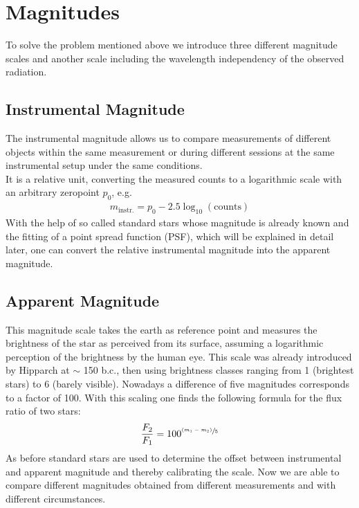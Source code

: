 \section{Magnitudes}
To solve the problem mentioned above we introduce three different magnitude scales and another scale including the wavelength independency of the observed radiation.
\subsection{Instrumental Magnitude}
The instrumental magnitude allows us to compare measurements of different objects within the same measurement or during different sessions at the same instrumental setup under the same conditions. \\
It is a relative unit, converting the measured counts to a logarithmic scale with an arbitrary zeropoint $p_0$, e.g.
\begin{align}
		m_{\text{instr.}} = p_0 - 2.5\log_{10}(\text{counts}) \label{eq1.4}
	\end{align}
With the help of so called standard stars whose magnitude is already known and the fitting of a point spread function (PSF), which will be explained in detail later, one can convert the relative instrumental magnitude into the apparent magnitude.
\subsection{Apparent Magnitude}
This magnitude scale takes the earth as reference point and measures the brightness of the star as perceived from its surface, assuming a logarithmic perception of the brightness by the human eye. This scale was already introduced by Hipparch at $\sim$ 150 b.c., then using brightness classes ranging from 1 (brightest stars) to 6 (barely visible). Nowadays a difference of five magnitudes corresponds to a factor of 100.
With this scaling one finds the following formula for the flux ratio of two stars: 
\begin{align}
	\frac{F_2}{F_1} = 100^{\sfrac{(m_1-m_2)}{5}}
\end{align}
As before standard stars are used to determine the offset between instrumental and apparent magnitude and thereby calibrating the scale. Now we are able to compare different magnitudes obtained from different measurements and with different circumstances.
